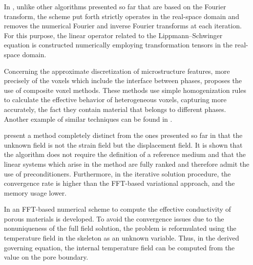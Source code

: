 In \cite{yvonnet_fast_2012}, unlike other algorithms presented so far that are based on the Fourier transform, the scheme put forth strictly operates in the real-space domain and removes the numerical Fourier and inverse Fourier transforms at each iteration. For this purpose, the linear operator related to the Lippmann–Schwinger equation is constructed numerically employing transformation tensors in the real-space domain.

Concerning the approximate discretization of microstructure features, more precisely of the voxels which include the interface between phases, \cite{mareau_different_2017} proposes the use of composite voxel methods.
These methods use simple homogenization rules to calculate the effective behavior of heterogeneous voxels, capturing more accurately, the fact they contain material that belongs to different phases.
Another example of similar techniques can be found in \cite{kabel_composite_2017}.

\cite{lucarini_dbfft_2019} present a method completely distinct from the ones presented so far in that the unknown field is not the strain field but the displacement field.
It is shown that the algorithm does not require the definition of a reference medium and that the linear systems which arise in the method are fully ranked and therefore admit the use of preconditioners.
Furthermore, in the iterative solution procedure, the convergence rate is higher than the FFT-based variational approach, and the memory usage lower.

In \cite{to_fft_2020} an FFT-based numerical scheme to compute the effective conductivity of porous materials is developed.
To avoid the convergence issues due to the nonuniqueness of the full field solution, the problem is reformulated using the temperature field in the skeleton as an unknown variable.
Thus, in the derived governing equation, the internal temperature field can be computed from the value on the pore boundary.
